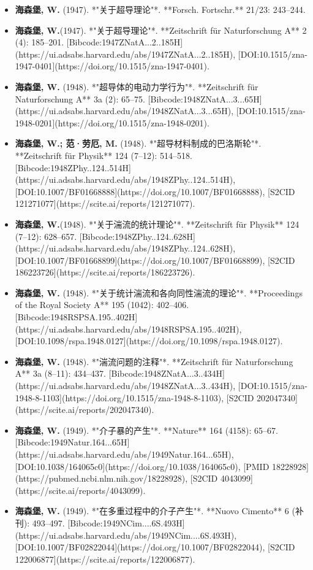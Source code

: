 \begin{itemize}
\item \textbf{海森堡, W.} (1947). *"关于超导理论"*. **Forsch. Fortschr.** 21/23: 243–244.  
\item \textbf{海森堡, W.}(1947). *"关于超导理论"*. **Zeitschrift für Naturforschung A** 2 (4): 185–201. [Bibcode:1947ZNatA...2..185H](https://ui.adsabs.harvard.edu/abs/1947ZNatA...2..185H), [DOI:10.1515/zna-1947-0401](https://doi.org/10.1515/zna-1947-0401).
\item \textbf{海森堡, W.} (1948). *"超导体的电动力学行为"*. **Zeitschrift für Naturforschung A** 3a (2): 65–75. [Bibcode:1948ZNatA...3...65H](https://ui.adsabs.harvard.edu/abs/1948ZNatA...3...65H), [DOI:10.1515/zna-1948-0201](https://doi.org/10.1515/zna-1948-0201).  
\item \textbf{海森堡, W.; 范·劳厄, M.} (1948). *"超导材料制成的巴洛斯轮"*. **Zeitschrift für Physik** 124 (7–12): 514–518. [Bibcode:1948ZPhy..124..514H](https://ui.adsabs.harvard.edu/abs/1948ZPhy..124..514H), [DOI:10.1007/BF01668888](https://doi.org/10.1007/BF01668888), [S2CID 121271077](https://scite.ai/reports/121271077).  
\item \textbf{海森堡, W.}(1948). *"关于湍流的统计理论"*. **Zeitschrift für Physik** 124 (7–12): 628–657. [Bibcode:1948ZPhy..124..628H](https://ui.adsabs.harvard.edu/abs/1948ZPhy..124..628H), [DOI:10.1007/BF01668899](https://doi.org/10.1007/BF01668899), [S2CID 186223726](https://scite.ai/reports/186223726).  
\item \textbf{海森堡, W.} (1948). *"关于统计湍流和各向同性湍流的理论"*. **Proceedings of the Royal Society A** 195 (1042): 402–406. [Bibcode:1948RSPSA.195..402H](https://ui.adsabs.harvard.edu/abs/1948RSPSA.195..402H), [DOI:10.1098/rspa.1948.0127](https://doi.org/10.1098/rspa.1948.0127).  
\item \textbf{海森堡, W.} (1948). *"湍流问题的注释"*. **Zeitschrift für Naturforschung A** 3a (8–11): 434–437. [Bibcode:1948ZNatA...3..434H](https://ui.adsabs.harvard.edu/abs/1948ZNatA...3..434H), [DOI:10.1515/zna-1948-8-1103](https://doi.org/10.1515/zna-1948-8-1103), [S2CID 202047340](https://scite.ai/reports/202047340).  
\item \textbf{海森堡, W.} (1949). *"介子暴的产生"*. **Nature** 164 (4158): 65–67. [Bibcode:1949Natur.164...65H](https://ui.adsabs.harvard.edu/abs/1949Natur.164...65H), [DOI:10.1038/164065c0](https://doi.org/10.1038/164065c0), [PMID 18228928](https://pubmed.ncbi.nlm.nih.gov/18228928), [S2CID 4043099](https://scite.ai/reports/4043099).  
\item \textbf{海森堡, W.} (1949). *"在多重过程中的介子产生"*. **Nuovo Cimento** 6 (补刊): 493–497. [Bibcode:1949NCim....6S.493H](https://ui.adsabs.harvard.edu/abs/1949NCim....6S.493H), [DOI:10.1007/BF02822044](https://doi.org/10.1007/BF02822044), [S2CID 122006877](https://scite.ai/reports/122006877).  

\end{itemize}
